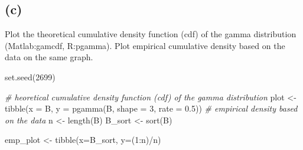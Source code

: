 \documentclass[
  10pt,
]{article}
\newenvironment{Shaded}{\begin{snugshade}}{\end{snugshade}}
\newcommand{\AttributeTok}[1]{\textcolor[rgb]{0.77,0.63,0.00}{#1}}
\newcommand{\CommentTok}[1]{\textcolor[rgb]{0.56,0.35,0.01}{\textit{#1}}}
\newcommand{\DecValTok}[1]{\textcolor[rgb]{0.00,0.00,0.81}{#1}}
\newcommand{\FloatTok}[1]{\textcolor[rgb]{0.00,0.00,0.81}{#1}}
\newcommand{\FunctionTok}[1]{\textcolor[rgb]{0.00,0.00,0.00}{#1}}
\newcommand{\NormalTok}[1]{#1}
\newcommand{\OtherTok}[1]{\textcolor[rgb]{0.56,0.35,0.01}{#1}}
\newcommand{\SpecialCharTok}[1]{\textcolor[rgb]{0.00,0.00,0.00}{#1}}
\begin{document}
\hypertarget{c-1}{%
\subsection*{(c)}\label{c-1}}

Plot the theoretical cumulative density function (cdf) of the gamma distribution (Matlab:gamcdf, R:pgamma). Plot empirical cumulative density based on the data on the same graph.

\begin{Shaded}
\begin{Highlighting}[]
\FunctionTok{set.seed}\NormalTok{(}\DecValTok{2699}\NormalTok{)}

\CommentTok{\# heoretical cumulative density function (cdf) of the gamma distribution}
\NormalTok{plot }\OtherTok{\textless{}{-}} \FunctionTok{tibble}\NormalTok{(}\AttributeTok{x =}\NormalTok{ B,}
               \AttributeTok{y =} \FunctionTok{pgamma}\NormalTok{(B,}
                          \AttributeTok{shape =} \DecValTok{3}\NormalTok{,}
                          \AttributeTok{rate =} \FloatTok{0.5}\NormalTok{))}
\CommentTok{\# empirical density based on the data}
\NormalTok{n }\OtherTok{\textless{}{-}} \FunctionTok{length}\NormalTok{(B)}
\NormalTok{B\_sort }\OtherTok{\textless{}{-}} \FunctionTok{sort}\NormalTok{(B)}

\NormalTok{emp\_plot }\OtherTok{\textless{}{-}} \FunctionTok{tibble}\NormalTok{(}\AttributeTok{x=}\NormalTok{B\_sort,}
                   \AttributeTok{y=}\NormalTok{(}\DecValTok{1}\SpecialCharTok{:}\NormalTok{n)}\SpecialCharTok{/}\NormalTok{n)}


\end{Highlighting}
\end{Shaded}
\end{document}
